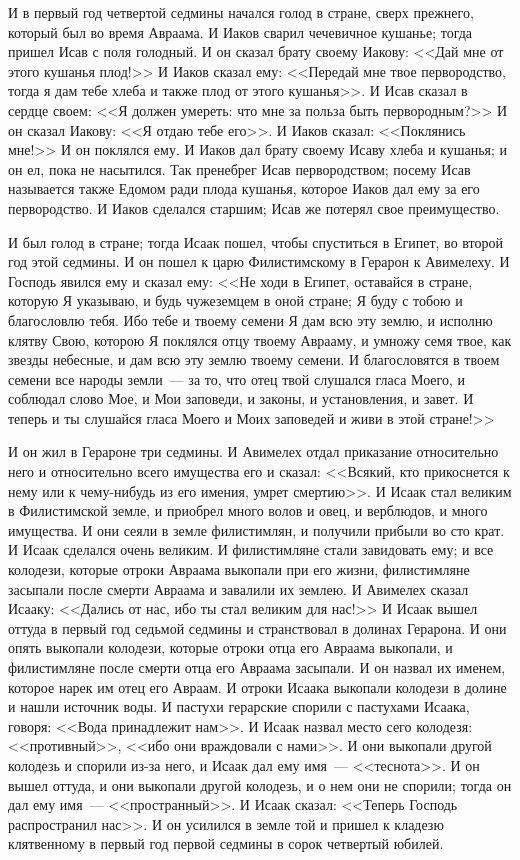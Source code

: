 И в первый год четвертой седмины начался голод
в стране, сверх прежнего, который был во время
Авраама. И Иаков сварил чечевичное кушанье; тогда
пришел Исав с поля голодный. И он сказал брату
своему Иакову: <<Дай мне от этого кушанья
плод!>> И Иаков сказал ему: <<Передай мне твое
первородство, тогда я дам тебе хлеба и также плод
от этого кушанья>>. И Исав сказал в сердце своем:
<<Я должен умереть: что мне за польза быть
первородным?>> И он сказал Иакову: <<Я отдаю
тебе его>>. И Иаков сказал: <<Поклянись мне!>>
И он поклялся ему. И Иаков дал брату своему Исаву
хлеба и кушанья; и он ел, пока не насытился. Так
пренебрег Исав первородством; посему Исав
называется также Едомом ради плода кушанья,
которое Иаков дал ему за его первородство. И
Иаков сделался старшим; Исав же потерял свое
преимущество.

И был голод в стране; тогда Исаак пошел, чтобы
спуститься в Египет, во второй год этой седмины. И
он пошел к царю Филистимскому в Герарон к
Авимелеху. И Господь явился ему и сказал ему:
<<Не ходи в Египет, оставайся в стране, которую Я
указываю, и будь чужеземцем в оной стране; Я буду
с тобою и благословлю тебя. Ибо тебе и твоему
семени Я дам всю эту землю, и исполню клятву Свою,
которою Я поклялся отцу твоему Аврааму, и умножу
семя твое, как звезды небесные, и дам всю эту
землю твоему семени. И благословятся в твоем
семени все народы земли~--- за то, что отец твой
слушался гласа Моего, и соблюдал слово Мое, и Мои
заповеди, и законы, и установления, и завет. И
теперь и ты слушайся гласа Моего и Моих заповедей
и живи в этой стране!>>

И он жил в Герароне три седмины. И Авимелех
отдал приказание относительно него и
относительно всего имущества его и сказал:
<<Всякий, кто прикоснется к нему или к
чему-нибудь из его имения, умрет смертию>>. И
Исаак стал великим в Филистимской земле, и
приобрел много волов и овец, и верблюдов, и много
имущества. И они сеяли в земле филистимлян, и
получили прибыли во сто крат. И Исаак сделался
очень великим. И филистимляне стали завидовать
ему; и все колодези, которые отроки Авраама
выкопали при его жизни, филистимляне засыпали
после смерти Авраама и завалили их землею. И
Авимелех сказал Исааку: <<Дались от нас, ибо ты
стал великим для нас!>> И Исаак вышел оттуда в
первый год седьмой седмины и странствовал в
долинах Герарона. И они опять выкопали колодези,
которые отроки отца его Авраама выкопали, и
филистимляне после смерти отца его Авраама
засыпали. И он назвал их именем, которое нарек им
отец его Авраам. И отроки Исаака выкопали
колодези в долине и нашли источник воды. И
пастухи герарские спорили с пастухами Исаака,
говоря: <<Вода принадлежит нам>>. И Исаак
назвал место сего колодезя: <<противный>>,
<<ибо они враждовали с нами>>. И они выкопали
другой колодезь и спорили из-за него, и Исаак дал
ему имя~--- <<теснота>>. И он вышел оттуда, и они
выкопали другой колодезь, и о нем они не спорили;
тогда он дал ему имя~--- <<пространный>>. И Исаак
сказал: <<Теперь Господь распространил нас>>.
И он усилился в земле той и пришел к кладезю
клятвенному в первый год первой седмины в сорок
четвертый юбилей.

